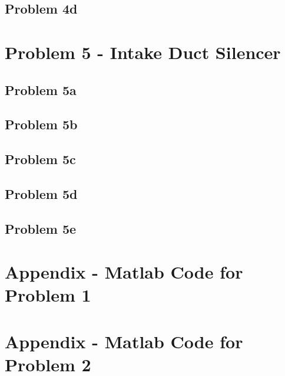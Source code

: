 {{\subsection*{Problem 4d}










\newpage
\section*{Problem 5 - Intake Duct Silencer}

\subsection*{Problem 5a}

\subsection*{Problem 5b}

\subsection*{Problem 5c}

\subsection*{Problem 5d}

\subsection*{Problem 5e}






\newpage
\section{Appendix - Matlab Code for Problem 1}
\label{appendix:problem1}





\newpage
\section{Appendix - Matlab Code for Problem 2}
\label{appendix:problem2}

}}
